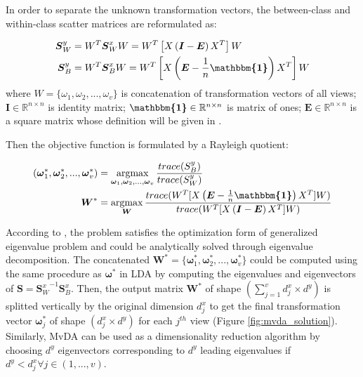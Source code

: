         In order to separate the unknown transformation vectors, the between-class and within-class scatter matrices are reformulated as:

        \begin{align}
            \boldsymbol{S}_W^y &= W^T \boldsymbol{S}_W^x W = W^T\left[X\left(\boldsymbol{I} - \boldsymbol{E}\right)X^T\right]W \label{eq:mvda_Sw_vec} \\
            \boldsymbol{S}_B^y &= W^T \boldsymbol{S}_B^x W = W^T\left[X\left(\boldsymbol{E} - \frac{1}{n}\boldsymbol{\mathbbm{1}}\right)X^T\right]W \label{eq:mvda_Sb_vec}
        \end{align}
        where $W = \{\omega_1,\omega_2,...,\omega_v\}$ is concatenation of transformation vectors of all views; $\boldsymbol{I} \in \mathbb{R}^{n\times n}$ is identity matrix; $\boldsymbol{\mathbbm{1}} \in \mathbb{R}^{n\times n}$ is matrix of ones; $\boldsymbol{E} \in \mathbb{R}^{n\times n}$ is a square matrix whose definition will be given in .

        Then the objective function is formulated by a Rayleigh quotient:

        \begin{align}
            (\boldsymbol{\omega}_1^*,\boldsymbol{\omega}_2^*, ..., \boldsymbol{\omega}_v^*) &= \operatorname*{argmax}_{\boldsymbol{\omega}_1, \boldsymbol{\omega}_2,..., \boldsymbol{\omega}_v}\frac{trace({S}_B^y)}{trace({S}_W^y)}\\
            \boldsymbol{W}^* &= \operatorname*{argmax}_{\boldsymbol{W}}\frac{trace(W^{T}[X\left(\boldsymbol{E} - \frac{1}{n}\boldsymbol{\mathbbm{1}}\right)X^{T}]W)}{trace(W^{T}[X\left(\boldsymbol{I} - \boldsymbol{E}\right)X^{T}]W)}
            \label{eq:MvDA}
        \end{align}

        According to \cite{kan2016multi}, the problem satisfies the optimization form of generalized eigenvalue problem and could be analytically solved through eigenvalue decomposition.
        The concatenated $\boldsymbol{W}^* = \{\boldsymbol{\omega}_1^*,\boldsymbol{\omega}_2^*, ..., \boldsymbol{\omega}_v^*\}$ could be computed using the same procedure as $\boldsymbol{\omega}^*$ in LDA by computing the eigenvalues and eigenvectors of $\boldsymbol{S} = {\boldsymbol{S}_W^x}^{-1}\boldsymbol{S}_B^x$.
        Then, the output matrix $\boldsymbol{W}^*$ of shape $(\sum_{j=1}^{v}{d_j^x} \times d^y)$ is splitted vertically by the original dimension $d_j^x$ to get the final transformation vector $\boldsymbol{\omega}_j^*$ of shape $(d_j^x \times d^y)$ for each $j^{th}$ view (Figure \ref{fig:mvda_solution}).
        Similarly, MvDA can be used as a dimensionality reduction algorithm by choosing $d^y$ eigenvectors corresponding to $d^y$ leading eigenvalues if $d^y < d_j^x \forall j \in (1, ..., v)$.

